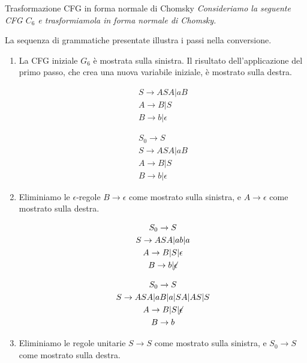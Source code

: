 \begin{Example}{Trasformazione CFG in forma normale di Chomsky}{}
\textit{Consideriamo la seguente CFG $C_6$ e trasformiamola in forma normale di Chomsky.}
    
La sequenza di grammatiche presentate illustra i passi nella conversione.
\begin{enumerate}
    \item La CFG iniziale $G_{6}$ è mostrata sulla sinistra. Il risultato dell'applicazione del primo passo, che crea una nuova variabile iniziale, è mostrato sulla destra.
    
    \begin{minipage}{0.49\textwidth}
    \begin{gather*}
        S\to ASA |aB\\
        A\to B|S\\
        B\to b|\epsilon
    \end{gather*}
    \end{minipage}
    \begin{minipage}{0.49\textwidth}
    \begin{gather*}
        S_0\to S\\
        S\to ASA|aB\\
        A\to B|S\\
        B\to b|\epsilon
    \end{gather*}    
    \end{minipage}
    \item Eliminiamo le $\epsilon$-regole $B\to \epsilon$ come mostrato sulla sinistra, e $A\to\epsilon$ come mostrato sulla destra.
    
    \begin{minipage}{0.49\textwidth}
    \begin{gather*}
        S_0\to S\\
        S\to ASA|ab|a\\
        A\to B|S|\epsilon\\
        B\to b|\cancel{\epsilon}
    \end{gather*}
    \end{minipage}
    \begin{minipage}{0.49\textwidth}
    \begin{gather*}
        S_0\to S\\
        S\to ASA|aB|a|SA|AS|S\\
        A\to B|S|\cancel{\epsilon}\\
        B\to b
    \end{gather*}    
    \end{minipage}
    \item[3a.] Eliminiamo le regole unitarie $S\to S$ come mostrato sulla sinistra, e $S_{0}\to S$ come mostrato sulla destra.


\end{enumerate}
\end{Example}
